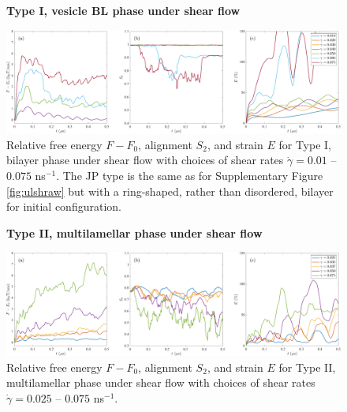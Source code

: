 \begin{figure}[h!]
\begin{center}
\textbf{Type I, vesicle BL phase under shear flow}\par\medskip
\includegraphics[width=\textwidth]{SMFigures/VeShRaw.pdf}
\end{center}
\caption{
Relative free energy $F - F_0$,
alignment $S_2$, and strain $E$ for
Type I, bilayer phase under shear flow with choices of shear rates $\dot\gamma=0.01$ -- $0.075$ ns$^{-1}$.
The JP type is the same as for Supplementary Figure \ref{fig:ulshraw} but with a
ring-shaped, rather than disordered, bilayer for initial configuration.  
}
\label{fig:veshraw}
\end{figure}


\begin{figure}[h!]
\textbf{Type II, multilamellar phase under shear flow}\par\medskip
\begin{center}
\includegraphics[width=\textwidth]{SMFigures/MLShRaw.pdf}
\end{center}
\caption{
Relative free energy $F - F_0$,
alignment $S_2$, and strain $E$ for
Type II, multilamellar phase under shear flow with choices of shear rates $\dot\gamma=0.025$ -- $0.075$ ns$^{-1}$.
}
\label{fig:mlshraw}
\end{figure}



